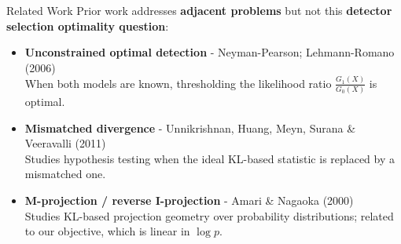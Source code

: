\documentclass[aspectratio=169, 10pt]{beamer}
\begin{document}
\begin{frame}{Related Work}
  \small
  \vfill
  Prior work addresses \textbf{adjacent problems} but not this
  \textbf{detector selection optimality question}:
  \vfill

  \begin{itemize}
    \setlength\itemsep{1.4em}

    \item \textbf{Unconstrained optimal detection} -
    Neyman-Pearson; Lehmann-Romano (2006)\\[-1pt]
    {\footnotesize When both models are known, thresholding the likelihood ratio
    \(\frac{G_1(X)}{G_0(X)}\) is optimal.}

    \item \textbf{Mismatched divergence} -
    Unnikrishnan, Huang, Meyn, Surana \& Veeravalli (2011)\\[-1pt]
    {\footnotesize Studies hypothesis testing when the ideal KL-based statistic
    is replaced by a mismatched one.}

    \item \textbf{M-projection / reverse I-projection} -
    Amari \& Nagaoka (2000)\\[-1pt]
    {\footnotesize Studies KL-based projection geometry over probability
    distributions; related to our objective, which is linear in
    \(\log p\).}

  \end{itemize}
  \vfill
\end{frame}


\end{document}
